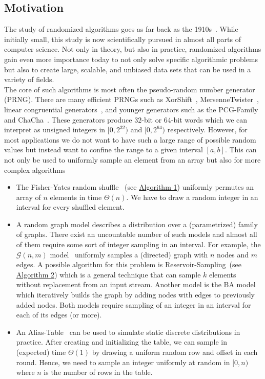 \documentclass[a4paper, UKenglish, cleveref, autoref, thm-restate]{lipics-v2021}
\begin{document}
\subsection{Motivation}
The study of randomized algorithms goes as far back as the 1910s~\cite{MathComp}.
While initially small, this study is now scientifically pursued in almost all parts of computer science.
Not only in theory, but also in practice, randomized algorithms gain even more importance today to not only solve specific algorithmic problems but also to create large, scalable, and unbiased data sets that can be used in a variety of fields.
\\
The core of such algorithms is most often the pseudo-random number generator (PRNG).
There are many efficient PRNGs such as XorShift~\cite{XS}, MersenneTwister~\cite{MT}, linear congruential generators~\cite{LinConGen, MINSTD, LM}, and younger generators such as the PCG-Family~\cite{PCG} and ChaCha~\cite{Cha}.
These generators produce $32$-bit or $64$-bit words which we can interpret as unsigned integers in $[0,2^{32})$ and $[0,2^{64})$ respectively.
However, for most applications we do not want to have such a large range of possible random values but instead want to confine the range to a given interval $[a,b]$.
This can not only be used to uniformly sample an element from an array but also for more complex algorithms
\begin{itemize}
    \item The Fisher-Yates random shuffle~\cite{FY} (see \hyperref[alg:fy]{Algorithm 1}) uniformly permutes an array of $n$ elements in time $\Theta(n)$. 
    We have to draw a random integer in an interval for every shuffled element.
    \item A random graph model describes a distribution over a (parametrized) family of graphs. 
    There exist an uncountable number of such models and almost all of them require some sort of integer sampling in an interval. 
    For example, the $\mathcal{G}(n,m)$ model~\cite{GNM} uniformly samples a (directed) graph with $n$ nodes and $m$ edges. 
    A possible algorithm for this problem is Reservoir-Sampling~\cite{Reservoir}(see \hyperref[alg:gnm]{Algorithm 2}) which is a general technique that can sample $k$ elements without replacement from an input stream. 
    Another model is the BA model~\cite{BABook,BA} which iteratively builds the graph by adding nodes with edges to previously added nodes. %
    Both models require sampling of an integer in an interval for each of its edges (or more).
    \item An Alias-Table~\cite{Alias} can be used to simulate static discrete distributions in practice. 
    After creating and initializing the table, we can sample in (expected) time $\Theta(1)$ by drawing a uniform random row and offset in each round. 
    Hence, we need to sample an integer uniformly at random in $[0,n)$ where $n$ is the number of rows in the table.
\end{itemize}
\end{document}
